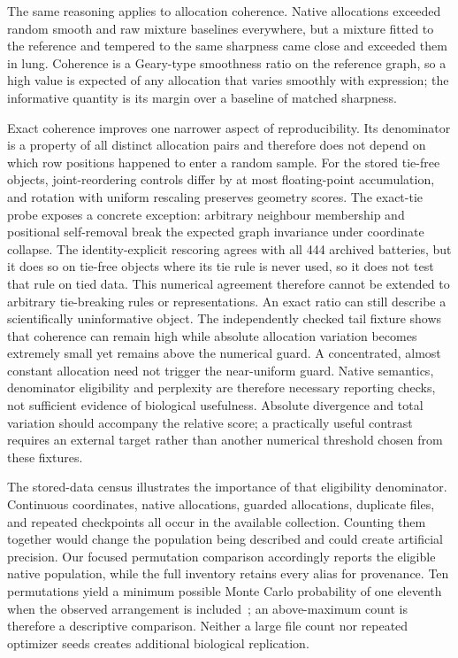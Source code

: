 \documentclass[11pt]{article}
\begin{document}
The same reasoning applies to allocation coherence. Native allocations exceeded random smooth and raw mixture baselines everywhere, but a mixture fitted to the reference and tempered to the same sharpness came close and exceeded them in lung. Coherence is a Geary-type smoothness ratio on the reference graph, so a high value is expected of any allocation that varies smoothly with expression; the informative quantity is its margin over a baseline of matched sharpness.

Exact coherence improves one narrower aspect of reproducibility. Its denominator is a property of all distinct allocation pairs and therefore does not depend on which row positions happened to enter a random sample. For the stored tie-free objects, joint-reordering controls differ by at most floating-point accumulation, and rotation with uniform rescaling preserves geometry scores. The exact-tie probe exposes a concrete exception: arbitrary neighbour membership and positional self-removal break the expected graph invariance under coordinate collapse. The identity-explicit rescoring agrees with all 444 archived batteries, but it does so on tie-free objects where its tie rule is never used, so it does not test that rule on tied data. This numerical agreement therefore cannot be extended to arbitrary tie-breaking rules or representations. An exact ratio can still describe a scientifically uninformative object. The independently checked tail fixture shows that coherence can remain high while absolute allocation variation becomes extremely small yet remains above the numerical guard. A concentrated, almost constant allocation need not trigger the near-uniform guard. Native semantics, denominator eligibility and perplexity are therefore necessary reporting checks, not sufficient evidence of biological usefulness. Absolute divergence and total variation should accompany the relative score; a practically useful contrast requires an external target rather than another numerical threshold chosen from these fixtures.

The stored-data census illustrates the importance of that eligibility denominator. Continuous coordinates, native allocations, guarded allocations, duplicate files, and repeated checkpoints all occur in the available collection. Counting them together would change the population being described and could create artificial precision. Our focused permutation comparison accordingly reports the eligible native population, while the full inventory retains every alias for provenance. Ten permutations yield a minimum possible Monte Carlo probability of one eleventh when the observed arrangement is included~\cite{phipson2010permutation}; an above-maximum count is therefore a descriptive comparison. Neither a large file count nor repeated optimizer seeds creates additional biological replication.
\end{document}
